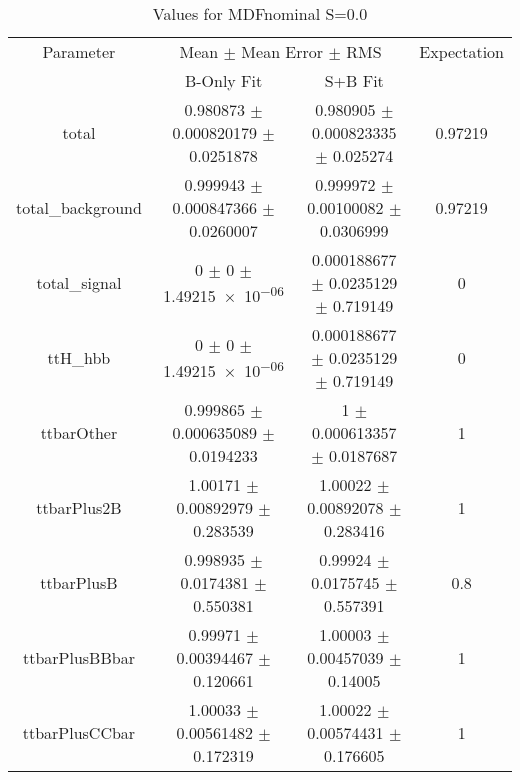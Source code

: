 \begin{table}
\centering
\caption{Values for MDFnominal S=0.0}
\begin{tabular}{cccc}
\toprule
Parameter & \multicolumn{2}{c}{Mean $\pm$ Mean Error $\pm$ RMS} & Expectation\\
 & B-Only Fit & S+B Fit & \\
\midrule
total & \num{0.980873} $\pm$ \num{0.000820179} $\pm$ \num{0.0251878} & \num{0.980905} $\pm$ \num{0.000823335} $\pm$ \num{0.025274} & \num{0.97219}\\
total\_background & \num{0.999943} $\pm$ \num{0.000847366} $\pm$ \num{0.0260007} & \num{0.999972} $\pm$ \num{0.00100082} $\pm$ \num{0.0306999} & \num{0.97219}\\
total\_signal & \num{0} $\pm$ \num{0} $\pm$ \num{1.49215e-06} & \num{0.000188677} $\pm$ \num{0.0235129} $\pm$ \num{0.719149} & \num{0}\\
ttH\_hbb & \num{0} $\pm$ \num{0} $\pm$ \num{1.49215e-06} & \num{0.000188677} $\pm$ \num{0.0235129} $\pm$ \num{0.719149} & \num{0}\\
ttbarOther & \num{0.999865} $\pm$ \num{0.000635089} $\pm$ \num{0.0194233} & \num{1} $\pm$ \num{0.000613357} $\pm$ \num{0.0187687} & \num{1}\\
ttbarPlus2B & \num{1.00171} $\pm$ \num{0.00892979} $\pm$ \num{0.283539} & \num{1.00022} $\pm$ \num{0.00892078} $\pm$ \num{0.283416} & \num{1}\\
ttbarPlusB & \num{0.998935} $\pm$ \num{0.0174381} $\pm$ \num{0.550381} & \num{0.99924} $\pm$ \num{0.0175745} $\pm$ \num{0.557391} & \num{0.8}\\
ttbarPlusBBbar & \num{0.99971} $\pm$ \num{0.00394467} $\pm$ \num{0.120661} & \num{1.00003} $\pm$ \num{0.00457039} $\pm$ \num{0.14005} & \num{1}\\
ttbarPlusCCbar & \num{1.00033} $\pm$ \num{0.00561482} $\pm$ \num{0.172319} & \num{1.00022} $\pm$ \num{0.00574431} $\pm$ \num{0.176605} & \num{1}\\
\bottomrule
\end{tabular}
\end{table}